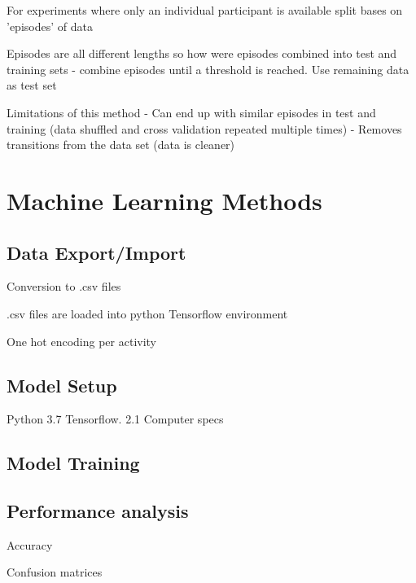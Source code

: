 For experiments where only an individual participant is available split bases on 'episodes' of data

Episodes are all different lengths so how were episodes combined into test and training sets
    - combine episodes until a threshold is reached. Use remaining data as test set

Limitations of this method
 - Can end up with similar episodes in test and training (data shuffled and cross validation repeated multiple times)
 - Removes transitions from the data set (data is cleaner)
 
 

\section{Machine Learning Methods}

\subsection{Data Export/Import}
Conversion to .csv files

.csv files are loaded into python Tensorflow environment

One hot encoding per activity

\subsection{Model Setup}
Python 3.7
Tensorflow. 2.1
Computer specs

\subsection{Model Training}

\subsection{Performance analysis}
Accuracy

Confusion matrices

